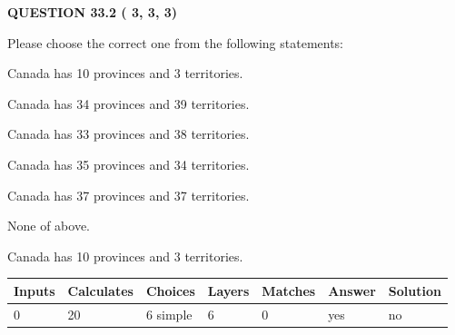 \documentclass[12pt]{article}
\begin{document}
{\textbf{\Large{QUESTION
33.2 
 (          3,          3,          3)
}}}
  
  
Please choose the correct one from the following statements:
 
 
Canada has  %
10 provinces and  %
3 territories.
 
 
Canada has  %
34 provinces and  %
39 territories.
 
 
Canada has  %
33 provinces and  %
38 territories.
 
 
Canada has  %
35 provinces and  %
34 territories.
 
 
Canada has  %
37 provinces and  %
37 territories.
 
 
 None of above.
 
 
\noindent{}
 
 
Canada has  %
10 provinces and  %
3 territories.
 
 
\noindent{}
 
 
   
   
   
   
\noindent\begin{tabular}{|l|l|l|l|l|l|l|}
 \hline
Inputs & Calculates & Choices & Layers & Matches & Answer & Solution \\ \hline
           0 & 
          20 & 
           6
  simple  
  & 
           6 & 
           0 & 
  yes & 
  no 
  \\ \hline
 \end{tabular}
   
   
   
   
\noindent{}
   
   
  
\end{document}
